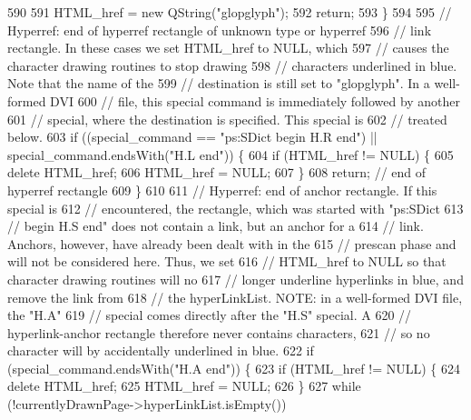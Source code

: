 \begin{DoxyCode}
590 
591       HTML\_href = \textcolor{keyword}{new} QString(\textcolor{stringliteral}{"glopglyph"});
592       \textcolor{keywordflow}{return};
593     \}
594 
595     \textcolor{comment}{// Hyperref: end of hyperref rectangle of unknown type or hyperref}
596     \textcolor{comment}{// link rectangle. In these cases we set HTML\_href to NULL, which}
597     \textcolor{comment}{// causes the character drawing routines to stop drawing}
598     \textcolor{comment}{// characters underlined in blue. Note that the name of the}
599     \textcolor{comment}{// destination is still set to "glopglyph". In a well-formed DVI}
600     \textcolor{comment}{// file, this special command is immediately followed by another}
601     \textcolor{comment}{// special, where the destination is specified. This special is}
602     \textcolor{comment}{// treated below.}
603     \textcolor{keywordflow}{if} ((special\_command == \textcolor{stringliteral}{"ps:SDict begin H.R end"}) || special\_command.endsWith(\textcolor{stringliteral}{"H.L end"})) \{
604       \textcolor{keywordflow}{if} (HTML\_href != NULL) \{
605         \textcolor{keyword}{delete} HTML\_href;
606         HTML\_href = NULL;
607       \}
608       \textcolor{keywordflow}{return}; \textcolor{comment}{// end of hyperref rectangle}
609     \}
610 
611     \textcolor{comment}{// Hyperref: end of anchor rectangle. If this special is}
612     \textcolor{comment}{// encountered, the rectangle, which was started with "ps:SDict}
613     \textcolor{comment}{// begin H.S end" does not contain a link, but an anchor for a}
614     \textcolor{comment}{// link. Anchors, however, have already been dealt with in the}
615     \textcolor{comment}{// prescan phase and will not be considered here. Thus, we set}
616     \textcolor{comment}{// HTML\_href to NULL so that character drawing routines will no}
617     \textcolor{comment}{// longer underline hyperlinks in blue, and remove the link from}
618     \textcolor{comment}{// the hyperLinkList. NOTE: in a well-formed DVI file, the "H.A"}
619     \textcolor{comment}{// special comes directly after the "H.S" special. A}
620     \textcolor{comment}{// hyperlink-anchor rectangle therefore never contains characters,}
621     \textcolor{comment}{// so no character will by accidentally underlined in blue.}
622     \textcolor{keywordflow}{if} (special\_command.endsWith(\textcolor{stringliteral}{"H.A end"})) \{
623       \textcolor{keywordflow}{if} (HTML\_href != NULL) \{
624         \textcolor{keyword}{delete} HTML\_href;
625         HTML\_href = NULL;
626       \}
627       \textcolor{keywordflow}{while} (!currentlyDrawnPage->hyperLinkList.isEmpty())

\end{DoxyCode}
